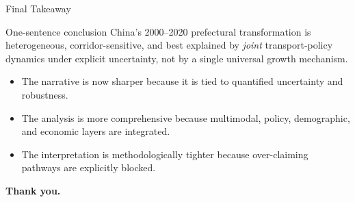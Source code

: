 \documentclass[aspectratio=169]{beamer}
\begin{document}
\begin{frame}{Final Takeaway}
\small
\begin{block}{One-sentence conclusion}
China's 2000--2020 prefectural transformation is heterogeneous, corridor-sensitive, and best explained by \emph{joint} transport-policy dynamics under explicit uncertainty, not by a single universal growth mechanism.
\end{block}
\vspace{0.4em}
\begin{itemize}
  \item The narrative is now sharper because it is tied to quantified uncertainty and robustness.
  \item The analysis is more comprehensive because multimodal, policy, demographic, and economic layers are integrated.
  \item The interpretation is methodologically tighter because over-claiming pathways are explicitly blocked.
\end{itemize}
\vfill
\centering
\textbf{Thank you.}
\end{frame}
\end{document}
